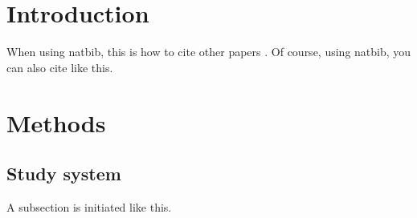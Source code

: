 \documentclass[11pt]{article}
\begin{document}



\baselineskip30pt

\clearpage

\setpagewiselinenumbers
\linenumbers




\section{Introduction}

When using natbib, this is how to cite other papers \citep{kopka2004glt}.
Of course, using natbib, you can also cite \citet{lamport1989ldp} like this.





\section{Methods}
\lipsum[66]

\subsection{Study system}
A subsection is initiated like this.
\lipsum[75]
\end{document}
